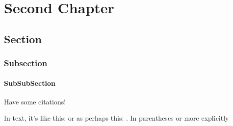\chapter{Second Chapter}



\section{Section}
\lipsum[1-2]

\subsection{Subsection}
\lipsum[1-2]

\subsubsection{SubSubSection}




\lipsum[1-2]

Have some citations!

In text, it's like this: \citet{amdahlValiditySingleProcessor1967} or as perhaps 
this: \citet{behrooziAverageStarFormation2013}. In parentheses 
\citep[e.g.][]{binneyGalacticDynamicsSecond2008a,bowerBreakingHierarchyGalaxy2006,gonnetSWIFTFastAlgorithms2013}
or more explicitly
\citep[before refs][ and after refs]{binneyGalacticDynamicsSecond2008a,bowerBreakingHierarchyGalaxy2006,gonnetSWIFTFastAlgorithms2013}


